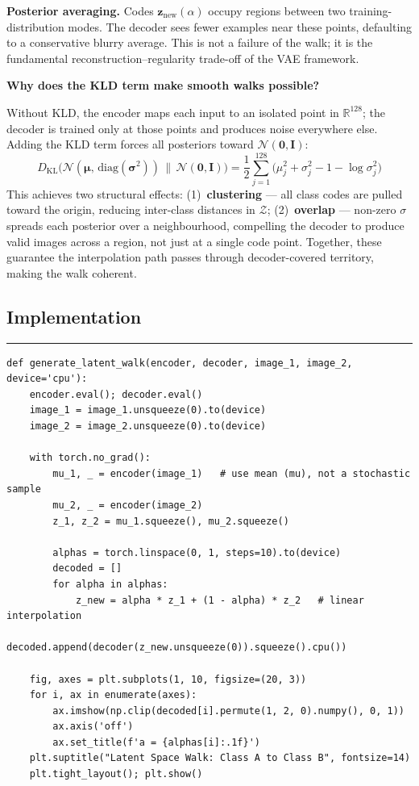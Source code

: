 \documentclass[11pt,a4paper]{article}
\begin{document}
\textbf{Posterior averaging.} Codes $\mathbf{z}_{\text{new}}(\alpha)$ occupy regions between two
training-distribution modes. The decoder sees fewer examples near these points, defaulting to a
conservative blurry average. This is not a failure of the walk; it is the fundamental
reconstruction--regularity trade-off of the VAE framework.

\textbf{Why does the KLD term make smooth walks possible?}

Without KLD, the encoder maps each input to an isolated point in $\mathbb{R}^{128}$; the decoder
is trained only at those points and produces noise everywhere else. Adding the KLD term forces all
posteriors toward $\mathcal{N}(\mathbf{0},\mathbf{I})$:
\[
    D_{\mathrm{KL}}\!\bigl(\mathcal{N}(\boldsymbol{\mu},\,\mathrm{diag}(\boldsymbol{\sigma}^2))
    \,\|\,\mathcal{N}(\mathbf{0},\mathbf{I})\bigr)
    = \frac{1}{2}\sum_{j=1}^{128}\bigl(\mu_j^2 + \sigma_j^2 - 1 - \log\sigma_j^2\bigr)
\]
This achieves two structural effects: (1)~\textbf{clustering} --- all class codes are pulled
toward the origin, reducing inter-class distances in $\mathcal{Z}$; (2)~\textbf{overlap} ---
non-zero $\sigma$ spreads each posterior over a neighbourhood, compelling the decoder to produce
valid images across a region, not just at a single code point. Together, these guarantee the
interpolation path passes through decoder-covered territory, making the walk coherent.

\subsection*{Implementation}
\noindent\rule{\linewidth}{0.4pt}

\begin{lstlisting}[caption={Latent walk: encode with mu, interpolate, decode.}]
def generate_latent_walk(encoder, decoder, image_1, image_2, device='cpu'):
    encoder.eval(); decoder.eval()
    image_1 = image_1.unsqueeze(0).to(device)
    image_2 = image_2.unsqueeze(0).to(device)

    with torch.no_grad():
        mu_1, _ = encoder(image_1)   # use mean (mu), not a stochastic sample
        mu_2, _ = encoder(image_2)
        z_1, z_2 = mu_1.squeeze(), mu_2.squeeze()

        alphas = torch.linspace(0, 1, steps=10).to(device)
        decoded = []
        for alpha in alphas:
            z_new = alpha * z_1 + (1 - alpha) * z_2   # linear interpolation
            decoded.append(decoder(z_new.unsqueeze(0)).squeeze().cpu())

    fig, axes = plt.subplots(1, 10, figsize=(20, 3))
    for i, ax in enumerate(axes):
        ax.imshow(np.clip(decoded[i].permute(1, 2, 0).numpy(), 0, 1))
        ax.axis('off')
        ax.set_title(f'a = {alphas[i]:.1f}')
    plt.suptitle("Latent Space Walk: Class A to Class B", fontsize=14)
    plt.tight_layout(); plt.show()
\end{lstlisting}
\end{document}

